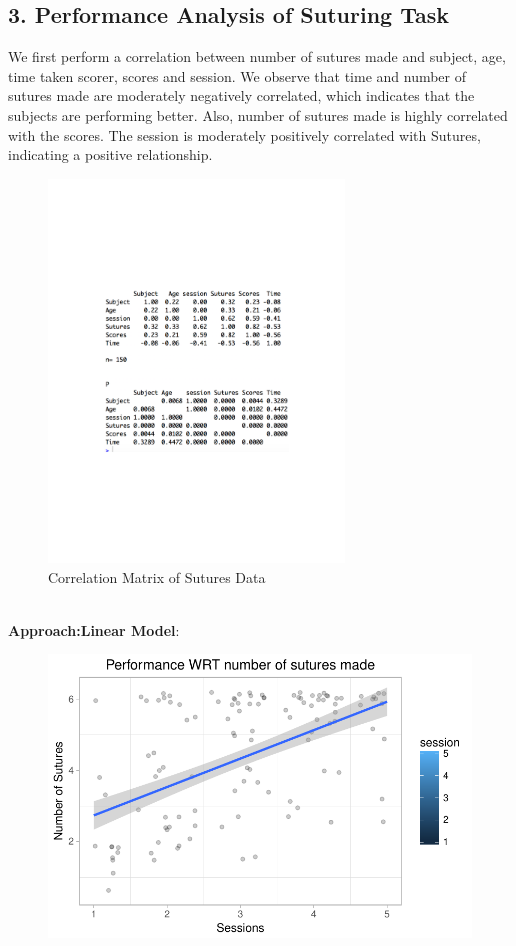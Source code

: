 \documentclass[12pt,epsf]{report}
\begin{document}
{\subsection*{3. Performance Analysis of Suturing Task}
We first perform a correlation between number of sutures made and subject, age, time taken scorer, scores and session. We observe that time and number of sutures made are moderately negatively correlated, which indicates that the subjects are performing better. Also, number of sutures made is highly correlated with the scores. The session is moderately positively correlated with Sutures, indicating a positive relationship. \\
\begin{figure}[!htb]
	\centering
	\includegraphics[width=0.7\textwidth]{Corr_Sutures.pdf}
	\caption{Correlation Matrix of Sutures Data}
	\centering
\end{figure}\\
\textbf{Approach:Linear Model}:
\begin{figure}[!htb]
	\begin{minipage}[c]{0.5\linewidth}
	\includegraphics[width=\linewidth]{PerformanceWRTSutures.pdf}

\end{minipage}
\end{figure}}
\end{document}
